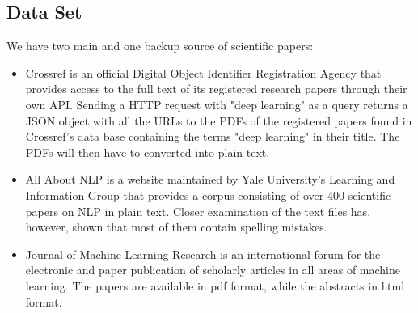 \subsection{Data Set}
\label{subsec:data}
We have two main and one backup source of scientific papers:
\begin{itemize}
	\item Crossref \cite{crossref} is an official Digital Object Identifier Registration Agency that provides access to the full text of its registered research papers through their own API. Sending a HTTP request with "deep learning" as a query returns a JSON object with all the URLs to the PDFs of the registered papers found in Crossref's data base containing the terms "deep learning" in their title. The PDFs will then have to converted into plain text.
	\item All About NLP \cite{aan} is a website maintained by Yale University's Learning and Information Group that provides a corpus consisting of over 400 scientific papers on NLP in plain text. Closer examination of the text files has, however, shown that most of them contain spelling mistakes.
	\item Journal of Machine Learning Research \cite{jmlr} is an international forum for the electronic and paper publication of scholarly articles in all areas of machine learning. The papers are available in pdf format, while the abstracts in html format.
\end{itemize}
